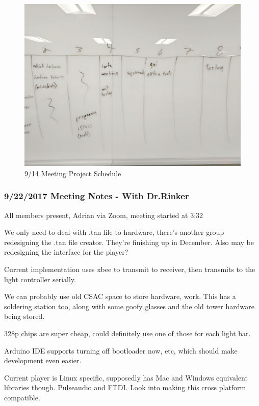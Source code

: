 \documentclass[12pt]{article}
\begin{document}
	\begin{figure}[!htb]
		\centering
		\includegraphics[width=140mm]{assets/9-14_Project_Agenda_2.jpg}
		\caption{9/14 Meeting Project Schedule \label{overflow}}
	\end{figure}
	
	\clearpage
	\subsubsection{9/22/2017 Meeting Notes - With Dr.Rinker}
	All members present, Adrian via Zoom, meeting started at 3:32

We only need to deal with .tan file to hardware, there’s another group redesigning the .tan file creator. They’re finishing up in December. Also may be redesigning the interface for the player?

Current implementation uses xbee to transmit to receiver, then transmits to the light controller serially. 

We can probably use old CSAC space to store hardware, work. This has a soldering station too, along with some goofy glasses and the old tower hardware being stored. 

328p chips are super cheap, could definitely use one of those for each light bar. 

Arduino IDE supports turning off bootloader now, etc, which should make development even easier. 

Current player is Linux specific, supposedly has Mac and Windows equivalent libraries though. Pulseaudio and FTDI. Look into making this cross platform compatible.
\end{document}
